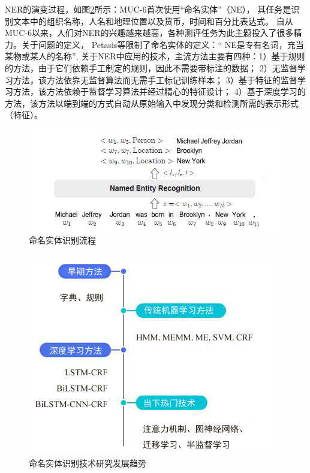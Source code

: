 NER的演变过程，如图\ref{fig:nerp}所示：MUC-6首次使用“命名实体”（NE），
其任务是识别文本中的组织名称，人名和地理位置以及货币，时间和百分比表达式。
自从MUC-6以来，人们对NER的兴趣越来越高，各种测评任务为此主题投入了很多精力。关于问题的定义，
Petasis等限制了命名实体的定义：“ NE是专有名词，充当某物或某人的名称”\cite{petasis2000automatic},
关于NER中应用的技术，主流方法主要有四种：1）基于规则的方法，由于它们依赖手工制定的规则，因此不需要带标注的数据； 
2）无监督学习方法，该方法依靠无监督算法而无需手工标记训练样本； 3）基于特征的监督学习方法，该方法依赖于监督学习算法并经过精心的特征设计； 
4）基于深度学习的方法，该方法以端到端的方式自动从原始输入中发现分类和检测所需的表示形式（特征）。

\begin{figure}[htbp]
  \centering
  \includegraphics[scale=1]{./images/nerp2.jpg}
  \caption{命名实体识别流程}
  \label{fig:nerp2}
\end{figure}

\begin{figure}[htbp]
  \centering
  \includegraphics[scale=1]{./images/nerp.jpg}
  \caption{命名实体识别技术研究发展趋势}
  \label{fig:nerp}
\end{figure}

